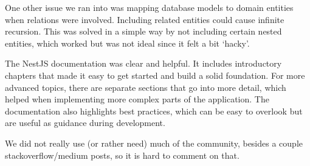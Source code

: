 One other issue we ran into was mapping database models to domain entities when relations were involved.
Including related entities could cause infinite recursion.
This was solved in a simple way by not including certain nested entities, which worked but was not ideal since it felt a bit `hacky'.

The NestJS documentation was clear and helpful.
It includes introductory chapters that made it easy to get started and build a solid foundation.
For more advanced topics, there are separate sections that go into more detail, which helped when implementing more complex parts of the application.
The documentation also highlights best practices, which can be easy to overlook but are useful as guidance during development.

We did not really use (or rather need) much of the community, besides a couple stackoverflow/medium posts, so it is hard to comment on that.
